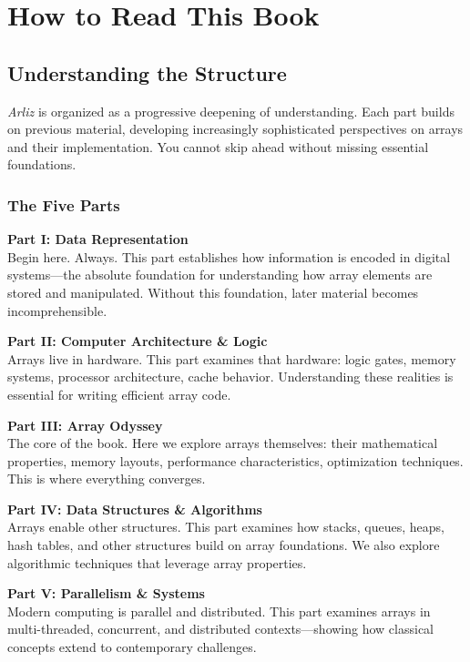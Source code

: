 \chapter*{How to Read This Book}

\section*{Understanding the Structure}

\textit{Arliz} is organized as a progressive deepening of understanding. Each part builds on previous material, developing increasingly sophisticated perspectives on arrays and their implementation. You cannot skip ahead without missing essential foundations.

\subsection*{The Five Parts}

\textbf{Part I: Data Representation}\\
Begin here. Always. This part establishes how information is encoded in digital systems—the absolute foundation for understanding how array elements are stored and manipulated. Without this foundation, later material becomes incomprehensible.

\textbf{Part II: Computer Architecture \& Logic}\\
Arrays live in hardware. This part examines that hardware: logic gates, memory systems, processor architecture, cache behavior. Understanding these realities is essential for writing efficient array code.

\textbf{Part III: Array Odyssey}\\
The core of the book. Here we explore arrays themselves: their mathematical properties, memory layouts, performance characteristics, optimization techniques. This is where everything converges.

\textbf{Part IV: Data Structures \& Algorithms}\\
Arrays enable other structures. This part examines how stacks, queues, heaps, hash tables, and other structures build on array foundations. We also explore algorithmic techniques that leverage array properties.

\textbf{Part V: Parallelism \& Systems}\\
Modern computing is parallel and distributed. This part examines arrays in multi-threaded, concurrent, and distributed contexts—showing how classical concepts extend to contemporary challenges.

